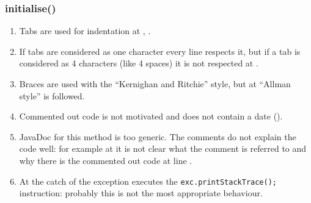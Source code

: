 \subsubsection{initialise()}
\begin{enumerate}
    \item {} Tabs are used for indentation at , .
    \item {} If tabs are considered as one character every line respects it, but if a tab is considered as 4 characters (like 4 spaces)  it is not respected at .
    \item {} Braces are used with the ``Kernighan and Ritchie'' style, but at  ``Allman style'' is followed.
    \item {} Commented out code is not motivated and does not contain a date ().
    \item {} JavaDoc for this method is too generic.
    The comments do not explain the code well: for example at  it is not clear what the comment is referred to and why there is the commented out code at line .
    \item {} At  the catch of the exception executes the \texttt{exc.printStackTrace();} instruction: probably this is not the most appropriate behaviour.
\end{enumerate}
